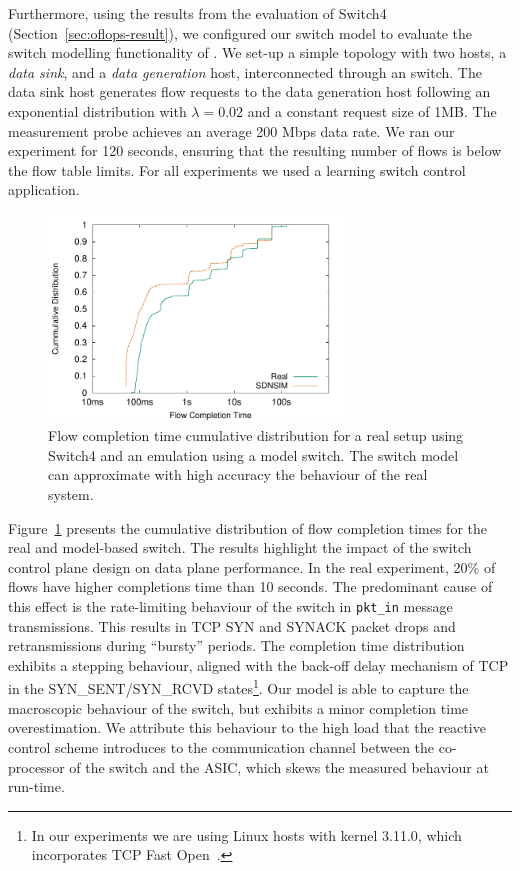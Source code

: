 Furthermore, using the results from the evaluation of Switch4 (Section~\ref{sec:oflops-result}),
we configured our switch model to evaluate the switch modelling functionality of \sdnsim.
We set-up a simple topology with two hosts, a \textit{data sink}, and a \textit{data generation} host,
interconnected through an \of switch. The data sink host generates flow
requests to the data generation host following an exponential distribution with
$\lambda=0.02$ and a constant request size of 1MB\@. The measurement probe achieves an average
200 Mbps data rate. We ran our experiment for 120 seconds, ensuring that the
resulting number of flows is below the flow table limits. For all experiments we
used a learning switch control application.

\begin{figure}[t] 
  \centering
  \includegraphics[width=0.70\textwidth]{Chapter1/Chapter1Figs/2hosts-cumm} 
  \caption[Flow completion time cumulative distribution using Switch4 and an
  \sdnsim emulation model]{Flow completion time cumulative distribution for a
  real setup using Switch4 and an \sdnsim emulation using a model switch. The
  switch model can approximate with high accuracy the behaviour of the
  real system.} 
  \label{fig:eval:switch-perf} 
\end{figure}


Figure~\ref{fig:eval:switch-perf} presents the cumulative distribution of flow
completion times for the real and model-based switch. The results highlight the
impact of the switch control plane design on data plane performance.  In the
real experiment, 20\% of flows have higher completions time than 10 seconds.
The predominant cause of this effect is the rate-limiting behaviour of the
switch in \texttt{pkt\_in} message transmissions. This results in TCP SYN and
SYNACK packet drops and retransmissions during ``bursty'' periods. The
completion time distribution exhibits a stepping behaviour, aligned with the
back-off delay mechanism of TCP in the SYN\_SENT/SYN\_RCVD states\footnote{In
    our experiments we are using Linux hosts with kernel 3.11.0, which
incorporates TCP Fast Open~\cite{Cheng13}.}. Our model is able to capture the
macroscopic behaviour of the switch, but exhibits a minor completion time
overestimation. We attribute this behaviour to the high load that the reactive
control scheme introduces to the communication channel between the co-processor
of the switch and the ASIC, which skews the measured behaviour at run-time.

